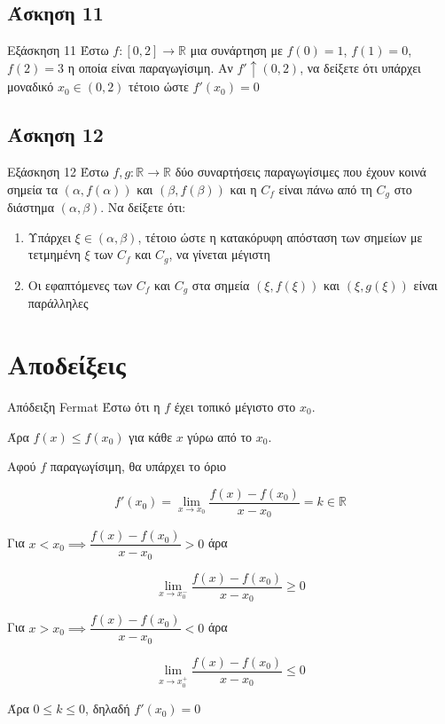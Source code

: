 \documentclass[greek]{beamer}
\begin{document}
\subsection{Άσκηση 11}
\begin{frame}[label=Άσκηση11,,t]{Εξάσκηση 11}
 Έστω $f:[0,2]\to\mathbb{R}$ μια συνάρτηση με $f(0)=1$, $f(1)=0$, $f(2)=3$ η οποία είναι παραγωγίσιμη. Αν $f'\uparrow (0,2)$, να δείξετε ότι υπάρχει μοναδικό $x_0\in (0,2)$ τέτοιο ώστε $f'(x_0)=0$

\end{frame}

\subsection{Άσκηση 12}
\begin{frame}[label=Άσκηση12,t]{Εξάσκηση 12}
 Έστω $f,g:\mathbb{R}\to\mathbb{R}$ δύο συναρτήσεις παραγωγίσιμες που έχουν κοινά σημεία τα $(α,f(α))$ και $(β,f(β))$ και η $C_f$ είναι πάνω από τη $C_g$ στο διάστημα $(α,β)$. Να δείξετε ότι:
 \begin{enumerate}
  \item<1-> Υπάρχει $ξ\in (α,β)$, τέτοιο ώστε η κατακόρυφη απόσταση των σημείων με τετμημένη $ξ$ των $C_f$ και $C_g$, να γίνεται μέγιστη
  \item<2-> Οι εφαπτόμενες των $C_f$ και $C_g$ στα σημεία $(ξ,f(ξ))$ και $(ξ,g(ξ))$ είναι παράλληλες
 \end{enumerate}

\end{frame}


\appendix

\section{Αποδείξεις}
\begin{frame}[label=Απόδειξη1]{Απόδειξη Fermat}
  Έστω ότι η $f$ έχει τοπικό μέγιστο στο $x_0$.

 Άρα $f(x)\le f(x_0)$ για κάθε $x$ γύρω από το $x_0$.

  Αφού $f$ παραγωγίσιμη, θα υπάρχει το όριο

 $$f'(x_0)=\lim\limits_{x \to x_0}{ \dfrac{f(x)-f(x_0)}{x-x_0} }=k\in\mathbb{R}$$

  Για $x<x_0\implies \dfrac{f(x)-f(x_0)}{x-x_0} >0$ άρα

 $$\lim\limits_{x \to x_0^-}{ \dfrac{f(x)-f(x_0)}{x-x_0} }\ge 0$$

  Για $x>x_0\implies \dfrac{f(x)-f(x_0)}{x-x_0} <0$ άρα

 $$\lim\limits_{x \to x_0^+}{ \dfrac{f(x)-f(x_0)}{x-x_0} }\le 0$$

  Άρα $0\le k \le 0$, δηλαδή $f'(x_0)=0$ \hyperlink{Θεώρημα1}{}
\end{frame}
\end{document}
